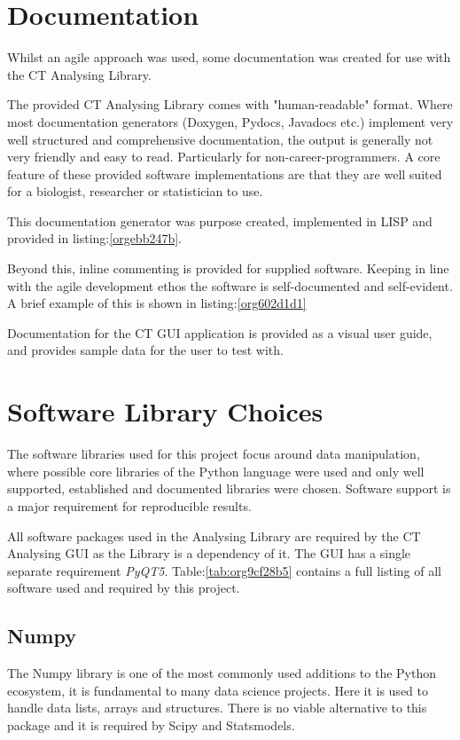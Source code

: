 \documentclass[11pt]{report}
\begin{document}
\section{Documentation}
\label{sec:org39ff29d}
Whilst an agile approach was used, some documentation was created for use with the CT Analysing Library.

The provided CT Analysing Library comes with "human-readable" format. Where most documentation generators (Doxygen, Pydocs, Javadocs etc.) implement very well structured and comprehensive documentation, the output is generally not very friendly and easy to read. Particularly for non-career-programmers. A core feature of these provided software implementations are that they are well suited for a biologist, researcher or statistician to use.

This documentation generator was purpose created, implemented in LISP and provided in listing:\ref{orgebb247b}.

Beyond this, inline commenting is provided for supplied software. Keeping in line with the agile development ethos the software is self-documented and self-evident. A brief example of this is shown in listing:\ref{org602d1d1}

Documentation for the CT GUI application is provided as a visual user guide, and provides sample data for the user to test with.
\section{Software Library Choices}
\label{sec:org2fcd1fb}
The software libraries used for this project focus around data manipulation, where possible core libraries of the Python language were used and only well supported, established and documented libraries were chosen. Software support is a major requirement for reproducible results.

All software packages used in the Analysing Library are required by the CT Analysing GUI as the Library is a dependency of it. The GUI has a single separate requirement \emph{PyQT5}.
Table:\ref{tab:org9cf28b5} contains a full listing of all software used and required by this project.
\subsection{Numpy}
\label{sec:orgfc3c7bd}
The Numpy library is one of the most commonly used additions to the Python ecosystem, it is fundamental to many data science projects. Here it is used to handle data lists, arrays and structures. There is no viable alternative to this package and it is required by Scipy and Statsmodels.
\end{document}
